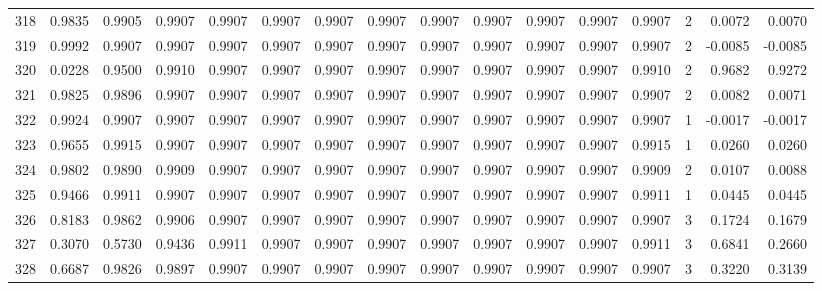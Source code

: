 \begin{tabular}{lrrrrrrrrrrrrrrr}
318 &      0.9835 &  0.9905 &  0.9907 &  0.9907 &  0.9907 &  0.9907 &  0.9907 &  0.9907 &  0.9907 &  0.9907 &   0.9907 &     0.9907 &      2 &                    0.0072 &                     0.0070 \\
319 &      0.9992 &  0.9907 &  0.9907 &  0.9907 &  0.9907 &  0.9907 &  0.9907 &  0.9907 &  0.9907 &  0.9907 &   0.9907 &     0.9907 &      2 &                   -0.0085 &                    -0.0085 \\
320 &      0.0228 &  0.9500 &  0.9910 &  0.9907 &  0.9907 &  0.9907 &  0.9907 &  0.9907 &  0.9907 &  0.9907 &   0.9907 &     0.9910 &      2 &                    0.9682 &                     0.9272 \\
321 &      0.9825 &  0.9896 &  0.9907 &  0.9907 &  0.9907 &  0.9907 &  0.9907 &  0.9907 &  0.9907 &  0.9907 &   0.9907 &     0.9907 &      2 &                    0.0082 &                     0.0071 \\
322 &      0.9924 &  0.9907 &  0.9907 &  0.9907 &  0.9907 &  0.9907 &  0.9907 &  0.9907 &  0.9907 &  0.9907 &   0.9907 &     0.9907 &      1 &                   -0.0017 &                    -0.0017 \\
323 &      0.9655 &  0.9915 &  0.9907 &  0.9907 &  0.9907 &  0.9907 &  0.9907 &  0.9907 &  0.9907 &  0.9907 &   0.9907 &     0.9915 &      1 &                    0.0260 &                     0.0260 \\
324 &      0.9802 &  0.9890 &  0.9909 &  0.9907 &  0.9907 &  0.9907 &  0.9907 &  0.9907 &  0.9907 &  0.9907 &   0.9907 &     0.9909 &      2 &                    0.0107 &                     0.0088 \\
325 &      0.9466 &  0.9911 &  0.9907 &  0.9907 &  0.9907 &  0.9907 &  0.9907 &  0.9907 &  0.9907 &  0.9907 &   0.9907 &     0.9911 &      1 &                    0.0445 &                     0.0445 \\
326 &      0.8183 &  0.9862 &  0.9906 &  0.9907 &  0.9907 &  0.9907 &  0.9907 &  0.9907 &  0.9907 &  0.9907 &   0.9907 &     0.9907 &      3 &                    0.1724 &                     0.1679 \\
327 &      0.3070 &  0.5730 &  0.9436 &  0.9911 &  0.9907 &  0.9907 &  0.9907 &  0.9907 &  0.9907 &  0.9907 &   0.9907 &     0.9911 &      3 &                    0.6841 &                     0.2660 \\
328 &      0.6687 &  0.9826 &  0.9897 &  0.9907 &  0.9907 &  0.9907 &  0.9907 &  0.9907 &  0.9907 &  0.9907 &   0.9907 &     0.9907 &      3 &                    0.3220 &                     0.3139 \\

\end{tabular}
